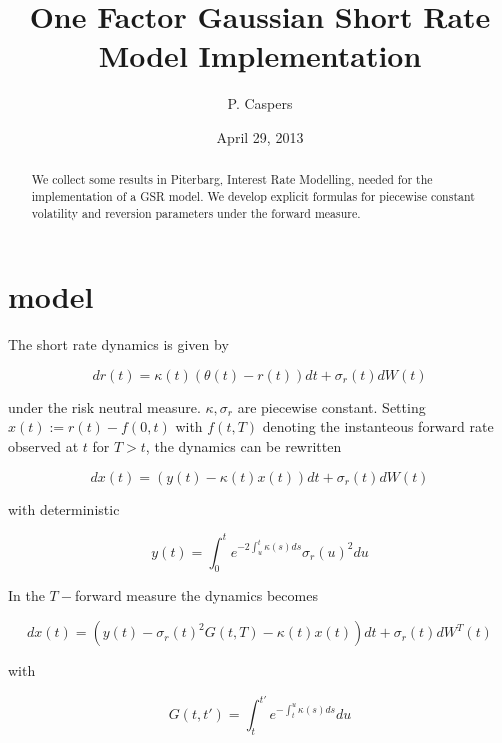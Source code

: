 \documentclass{amsart}
\theoremstyle{plain}
\numberwithin{equation}{section}
\begin{document}
\title[One Factor Gaussian Short Rate Model Implementation]{One Factor Gaussian Short Rate Model Implementation}
\author{P. Caspers}
\date{April 29, 2013}
\begin{abstract}
We collect some results in Piterbarg, Interest Rate Modelling, needed for the implementation of a GSR model. We develop explicit formulas
for piecewise constant volatility and reversion parameters under the forward measure.
\end{abstract}

\maketitle


\section{model}
The short rate dynamics is given by

\begin{equation}
dr(t) = \kappa(t) ( \theta(t) - r(t) ) dt + \sigma_r(t) dW(t)
\end{equation}

under the risk neutral measure. $\kappa, \sigma_r$ are piecewise constant. Setting $x(t) := r(t) - f(0,t)$ with $f(t,T)$ denoting
the instanteous forward rate observed at $t$ for $T>t$, the dynamics can be rewritten

\begin{equation}
dx(t) = ( y(t) - \kappa(t) x(t) ) dt + \sigma_r(t) dW(t)
\end{equation}

with deterministic

\begin{equation}\label{smallY}
y(t) = \int_0^t e^{-2 \int_u^t \kappa(s) ds} \sigma_r(u)^2 du
\end{equation}

In the $T-$forward measure the dynamics becomes

\begin{equation}
dx(t) = (y(t)-\sigma_r(t)^2G(t,T)-\kappa(t)x(t))dt+\sigma_r(t)dW^T(t)
\end{equation}

with

\begin{equation}\label{bigG}
G(t,t') = \int_t^{t'} e^{-\int_t^u\kappa(s)ds} du
\end{equation}
\end{document}
